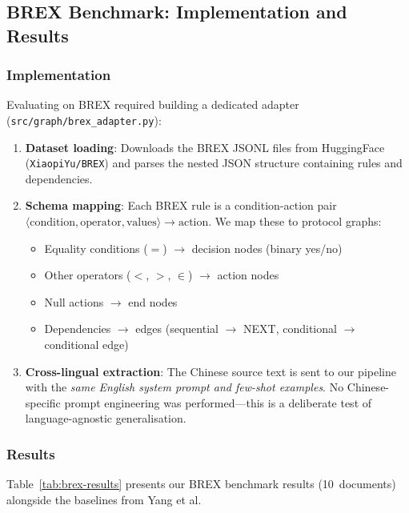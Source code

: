 \documentclass[12pt,a4paper]{article}
\begin{document}
\subsection{BREX Benchmark: Implementation and Results}
\label{sec:brex-results}

\subsubsection{Implementation}

Evaluating on BREX required building a dedicated adapter (\texttt{src/graph/brex\_adapter.py}):
\begin{enumerate}[leftmargin=2em]
    \item \textbf{Dataset loading}: Downloads the BREX JSONL files from HuggingFace (\texttt{XiaopiYu/BREX}) and parses the nested JSON structure containing rules and dependencies.
    \item \textbf{Schema mapping}: Each BREX rule is a condition-action pair $\langle\text{condition}, \text{operator}, \text{values}\rangle \rightarrow \text{action}$. We map these to protocol graphs:
    \begin{itemize}
        \item Equality conditions ($=$) $\rightarrow$ decision nodes (binary yes/no)
        \item Other operators ($<$, $>$, $\in$) $\rightarrow$ action nodes
        \item Null actions $\rightarrow$ end nodes
        \item Dependencies $\rightarrow$ edges (sequential $\rightarrow$ NEXT, conditional $\rightarrow$ conditional edge)
    \end{itemize}
    \item \textbf{Cross-lingual extraction}: The Chinese source text is sent to our pipeline with the \emph{same English system prompt and few-shot examples}. No Chinese-specific prompt engineering was performed---this is a deliberate test of language-agnostic generalisation.
\end{enumerate}

\subsubsection{Results}

Table~\ref{tab:brex-results} presents our BREX benchmark results (10~documents) alongside the baselines from Yang et al.
\end{document}
